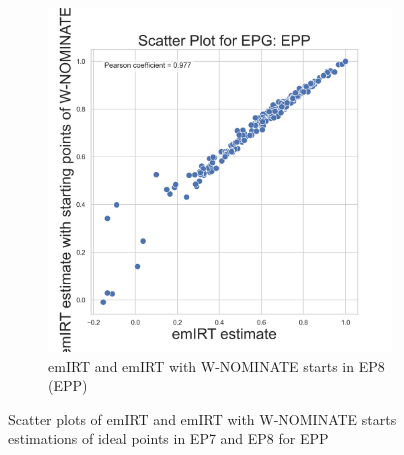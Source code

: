 \documentclass[a4paper,12pt]{report}
\begin{document}
\begin{figure}[H]
\begin{subfigure}[b]{0.48\textwidth}
                        \includegraphics[width=\textwidth]{Graphs/ScatterEMEIGEN_8_EPG_EPP}
                        \caption{emIRT and emIRT with W-NOMINATE starts in EP8 (EPP)}
                        \label{fig:EMEIGEN_SCATTER_8EPP}
                    \end{subfigure}
                    \caption
                    {Scatter plots of emIRT and emIRT with W-NOMINATE starts estimations of ideal points in EP7 and EP8
                    for EPP}
                    \label{fig:EMEIGEN_SCATTER_7_8EPP}
                \end{figure}
\end{document}
